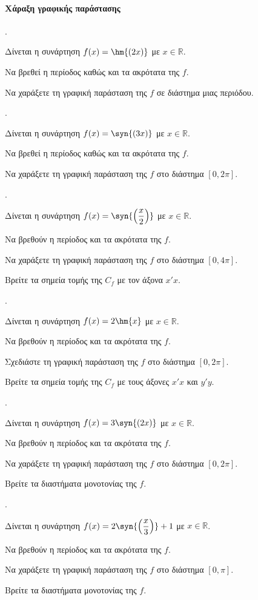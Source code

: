 \documentclass[11pt,a4paper,twocolumn]{article}
\newcounter{askhsh}
\newcommand{\askhsh}{\large\theaskhsh.\ \addtocounter{askhsh}{1}}
\begin{document}
\paragraph{Χάραξη γραφικής παράστασης}
\askhsh Δίνεται η συνάρτηση $f(x)=\hm{(2x)}$ με $x\in\mathbb{R}$.
\begin{alist}
\item Να βρεθεί η περίοδος καθώς και τα ακρότατα της $f$.
\item Να χαράξετε τη γραφική παράσταση της $f$ σε διάστημα μιας περιόδου.
\end{alist}
\askhsh Δίνεται η συνάρτηση $f(x)=\syn{(3x)}$ με $x\in\mathbb{R}$.
\begin{alist}
\item Να βρεθεί η περίοδος καθώς και τα ακρότατα της $f$.
\item Να χαράξετε τη γραφική παράσταση της $f$ στο διάστημα $[0,2\pi]$.
\end{alist}
\askhsh Δίνεται η συνάρτηση $f(x)=\syn{\left(\dfrac{x}{2}\right)}$ με $x\in\mathbb{R}$.
\begin{alist}
\item Να βρεθούν η περίοδος και τα ακρότατα της $f$.
\item Να χαράξετε τη γραφική παράσταση της $f$ στο διάστημα $[0,4\pi]$.
\item Βρείτε τα σημεία τομής της $C_f$ με τον άξονα $x'x$.
\end{alist}
\askhsh Δίνεται η συνάρτηση $f(x)=2\hm{x}$ με $x\in\mathbb{R}$.
\begin{alist}
\item Να βρεθούν η περίοδος και τα ακρότατα της $f$.
\item Σχεδιάστε τη γραφική παράσταση της $f$ στο διάστημα $[0,2\pi]$.
\item Βρείτε τα σημεία τομής της $C_f$ με τους άξονες $x'x$ και $y'y$.
\end{alist}
\askhsh Δίνεται η συνάρτηση $f(x)=3\syn{\left(2x\right)}$ με $x\in\mathbb{R}$.
\begin{alist}
\item Να βρεθούν η περίοδος και τα ακρότατα της $f$.
\item Να χαράξετε τη γραφική παράσταση της $f$ στο διάστημα $[0,2\pi]$.
\item Βρείτε τα διαστήματα μονοτονίας της $f$.
\end{alist}
\askhsh Δίνεται η συνάρτηση $f(x)=2\syn{\left(\dfrac{x}{3}\right)}+1$ με $x\in\mathbb{R}$.
\begin{alist}
\item Να βρεθούν η περίοδος και τα ακρότατα της $f$.
\item Να χαράξετε τη γραφική παράσταση της $f$ στο διάστημα $[0,\pi]$.
\item Βρείτε τα διαστήματα μονοτονίας της $f$.
\end{alist}
\end{document}
